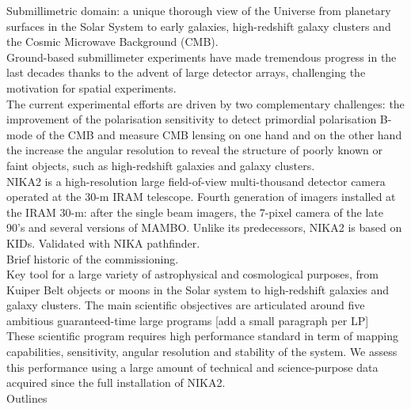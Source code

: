 
Submillimetric domain: a unique thorough view of the Universe from
planetary surfaces in the Solar System to early galaxies,
high-redshift galaxy clusters and the Cosmic Microwave
Background (CMB).\\

Ground-based submillimeter experiments have made tremendous progress in the last
decades thanks to the advent of large detector arrays, challenging the
motivation for spatial experiments.\\

The current experimental efforts are driven by two complementary
challenges: the improvement of the polarisation sensitivity to detect
primordial polarisation B-mode of the CMB and measure CMB lensing on
one hand and on the other hand the increase the angular resolution to
reveal the structure of poorly known or faint objects, such as
high-redshift galaxies and galaxy clusters.\\

NIKA2 is a high-resolution large field-of-view multi-thousand detector
camera operated at the 30-m IRAM telescope. Fourth generation of
imagers installed at the IRAM 30-m: after the single beam
imagers, the 7-pixel camera of the late 90's and several versions of
MAMBO. Unlike its predecessors, NIKA2 is based on KIDs. Validated with
NIKA pathfinder.\\

Brief historic of the commissioning. \\

Key tool for a large variety of astrophysical and cosmological
purposes, from Kuiper Belt objects or moons in the Solar system to
high-redshift galaxies and galaxy clusters. The main scientific
obsjectives are articulated around five ambitious guaranteed-time
large programs [add a small paragraph per LP]\\

These scientific program requires high performance standard in term of
mapping capabilities, sensitivity, angular resolution and stability of
the system. We assess this performance using a large amount of
technical and science-purpose data acquired since the full
installation of NIKA2.\\

Outlines













